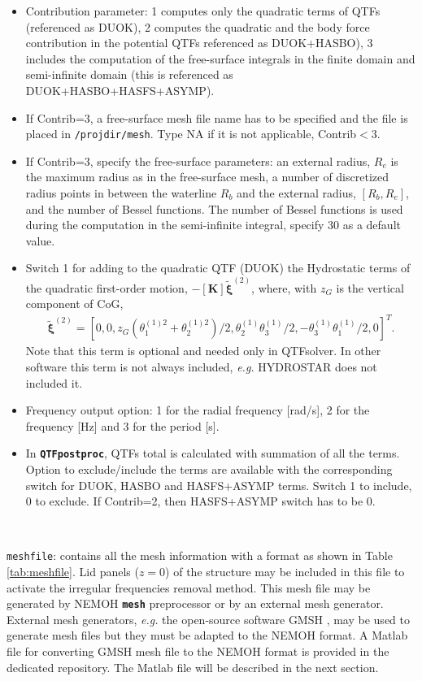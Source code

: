 \documentclass[12pt,a4paper,titlepage]{article}
\newcommand{\bs}{\boldsymbol}
\begin{document}
\begin{itemize}
\begin{itemize}
\item Contribution parameter: 1 computes only the quadratic terms of QTFs (referenced as DUOK), 2 computes the quadratic and the body force contribution in the potential QTFs referenced as DUOK+HASBO), 3 includes the computation of the free-surface integrals in the finite domain and semi-infinite domain (this is referenced as DUOK+HASBO+HASFS+ASYMP).
\item If Contrib=3, a free-surface mesh file name has to be specified and the file is placed in \texttt{/projdir/mesh}. Type NA if it is not applicable, Contrib$<3$.
\item If Contrib=3, specify the free-surface parameters: an external radius, $R_e$ is the maximum radius as in the free-surface mesh, a number of discretized radius points in between the waterline $R_b$ and the external radius,  $[R_b,R_e]$, and the number of Bessel functions. The number of Bessel functions is used during the computation in the semi-infinite integral, specify 30 as a default value.
\item Switch 1 for adding to the quadratic QTF (DUOK) the Hydrostatic terms of the quadratic first-order motion, $-[\bs K] \tilde{\bs \xi}^{(2)}$, where, with $z_G$ is the vertical component of CoG,
\begin{align*}
\tilde{\bs\xi}^{(2)}=[0,0,z_G(\theta_1^{(1)2}+\theta_2^{(1)2})/2,\theta_2^{(1)}\theta_3^{(1)}/2,-\theta_3^{(1)}\theta_1^{(1)}/2,0]^T.
\end{align*}  
Note that this term is optional and needed only in QTFsolver. In other software this term is not always included, \emph{e.g.} HYDROSTAR \cite{HYDROSTAR} does not included it.
\item Frequency output option: 1 for the radial frequency [rad/s], 2 for the frequency [Hz] and 3 for the period [s].
\item In \texttt{\textbf{QTFpostproc}}, QTFs total is calculated with summation of all the terms. Option to exclude/include the terms are available with the corresponding switch for DUOK, HASBO and HASFS+ASYMP terms. Switch 1 to include, 0 to exclude. If Contrib=2, then HASFS+ASYMP switch has to be 0.
\end{itemize}
\end{itemize}
\

\noindent
\texttt{meshfile}: contains all the mesh information with a format as shown in Table \ref{tab:meshfile}. Lid panels ($z=0$) of the structure may be included in this file to activate the irregular frequencies removal method. This mesh file may be generated by NEMOH \textbf{\texttt{mesh}} preprocessor or by an external mesh generator.
External mesh generators, \emph{e.g.} the open-source software GMSH \cite{gmsh}, may be used to generate mesh files but they must be adapted to the NEMOH format. A Matlab file for converting GMSH mesh file to the NEMOH format is provided in the dedicated repository. The Matlab file will be described in the next section.\\
\end{document}
